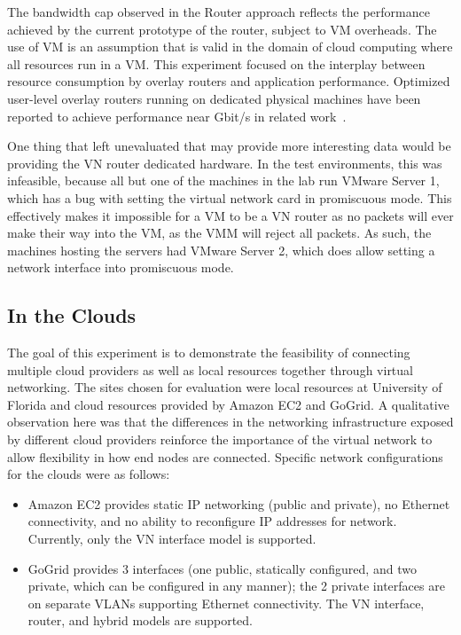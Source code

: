 The bandwidth cap observed in the Router approach reflects the performance
achieved by the current prototype of the router, subject to VM overheads. The
use of VM is an assumption that is valid in the domain of cloud computing where
all resources run in a VM. This experiment focused on the interplay between
resource consumption by overlay routers and application performance.  Optimized
user-level overlay routers running on dedicated physical machines have been
reported to achieve performance near Gbit/s in related work~\cite{vine2}.

One thing that left unevaluated that may provide more interesting data would be
providing the VN router dedicated hardware.  In the test environments, this was
infeasible, because all but one of the machines in the lab run VMware Server 1,
which has a bug with setting the virtual network card in promiscuous mode.
This effectively makes it impossible for a VM to be a VN router as no packets
will ever make their way into the VM, as the VMM will reject all packets.  As
such, the machines hosting the servers had VMware Server 2, which does allow
setting a network interface into promiscuous mode.

\subsection{In the Clouds}

The goal of this experiment is to demonstrate the feasibility of connecting
multiple cloud providers as well as local resources together through virtual
networking.  The sites chosen for evaluation were local resources at University
of Florida and cloud resources provided by Amazon EC2 and GoGrid.  A
qualitative observation here was that the differences in the networking
infrastructure exposed by different cloud providers reinforce the importance of
the virtual network to allow flexibility in how end nodes are connected.
Specific network configurations for the clouds were as follows:

\begin{itemize}

\item Amazon EC2 provides static IP networking (public and private), no
Ethernet connectivity, and no ability to reconfigure IP addresses for network.
Currently, only the VN interface model is supported.

\item GoGrid provides 3 interfaces (one public, statically configured, and two
private, which can be configured in any manner); the 2 private interfaces are
on separate VLANs supporting Ethernet connectivity. The VN interface, router,
and hybrid models are supported.

\end{itemize}

